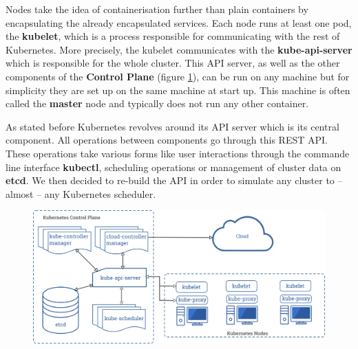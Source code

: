 Nodes take the idea of containerisation further than plain containers by
encapsulating the already encapsulated services.  Each node runs at least one
pod, the \textbf{kubelet}, which is a process responsible for communicating
with the rest of Kubernetes. More precisely, the kubelet communicates with the
\textbf{kube-api-server} which is responsible for the whole cluster.  This API
server, as well as the other components of the \textbf{Control Plane} (figure
\ref{fig:kube-components}), can be run on any machine but for simplicity they
are set up on the same machine at start up. This machine is often called the
\textbf{master} node and typically does not run any other container.

As stated before Kubernetes revolves around its API server which is its central
component. All operations between components go through this REST API. These
operations take various forms like user interactions through the commande line
interface \textbf{kubectl}, scheduling operations or management of cluster data
on \textbf{etcd}. We then decided to re-build the API in order to simulate any
cluster to -- almost -- any Kubernetes scheduler.

\begin{figure}[h]
	\centering
	\includegraphics[width=\textwidth]{./imgs/components-of-kubernetes.png}
	\label{fig:kube-components}
\end{figure}

